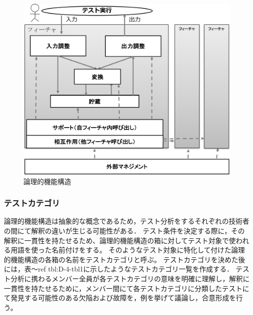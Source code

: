 \documentclass[a4paper,12pt]{jreport}
\begin{document}
\begin{figure}[h]
  \begin{center}
  \includegraphics[width=12cm]{./image/D-3-Fig3.png}
  \caption{論理的機能構造}
  \label{fig:D-4-Fig2}
  \end{center}
   \end{figure}

\subsubsection{テストカテゴリ}
論理的機能構造は抽象的な概念であるため，テスト分析をするそれぞれの技術者の間にて解釈の違いが生じる可能性がある． テスト条件を決定する際に，その解釈に一貫性を持たせるため、論理的機能構造の箱に対してテスト対象で使われる用語を使った名前付けをする。 そのようなテスト対象に特化して付けた論理的機能構造の各箱の名前をテストカテゴリと呼ぶ。 テストカテゴリを決めた後には，表〜ref {tbl:D-4-tbl1}に示したようなテストカテゴリ一覧を作成する． テスト分析に携わるメンバー全員が各テストカテゴリの意味を明確に理解し，解釈に一貫性を持たせるために，メンバー間にて各テストカテゴリに分類したテストにて発見する可能性のある欠陥および故障を，例を挙げて議論し，合意形成を行う。
\end{document}
